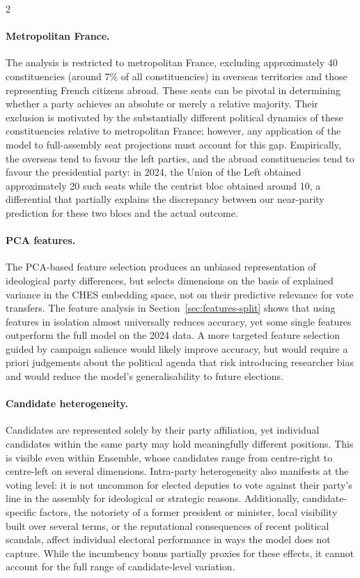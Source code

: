 \documentclass[10pt, a4paper]{article}
\begin{document}
\begin{multicols}{2}
\paragraph{Metropolitan France.}
The analysis is restricted to metropolitan France, excluding approximately 40
constituencies (around 7\% of all constituencies) in overseas territories and
those representing French citizens abroad. These seats can be pivotal in
determining whether a party achieves an absolute or merely a relative majority.
Their exclusion is motivated by the substantially different political dynamics
of these constituencies relative to metropolitan France; however, any
application of the model to full-assembly seat projections must account for
this gap. Empirically, the overseas tend to favour the left parties, and the abroad constituencies tend to favour
the presidential party: in 2024, the Union of the Left obtained approximately
20 such seats while the centrist bloc obtained around 10, a differential that
partially explains the discrepancy between our near-parity prediction for these
two blocs and the actual outcome.

\paragraph{PCA features.}
The PCA-based feature selection produces an unbiased representation of
ideological party differences, but selects dimensions on the basis of
explained variance in the CHES embedding space, not on their predictive
relevance for vote transfers. The feature analysis in
Section~\ref{sec:features-split} shows that using features in isolation
almost universally reduces accuracy, yet some single features outperform the
full model on the 2024 data. A more targeted feature selection guided by
campaign salience would likely improve accuracy, but would require a priori
judgements about the political agenda that risk introducing researcher bias
and would reduce the model's generalisability to future elections.

\paragraph{Candidate heterogeneity.}
Candidates are represented solely by their party affiliation, yet individual
candidates within the same party may hold meaningfully different positions.
This is visible even within Ensemble, whose candidates range from centre-right
to centre-left on several dimensions. Intra-party heterogeneity also manifests
at the voting level: it is not uncommon for elected deputies to vote against
their party's line in the assembly for ideological or strategic reasons.
Additionally, candidate-specific factors, the notoriety of a former
president or minister, local visibility built over several terms, or the
reputational consequences of recent political scandals, affect individual
electoral performance in ways the model does not capture. While the incumbency
bonus partially proxies for these effects, it cannot account for the full
range of candidate-level variation.


\end{multicols}
\end{document}
